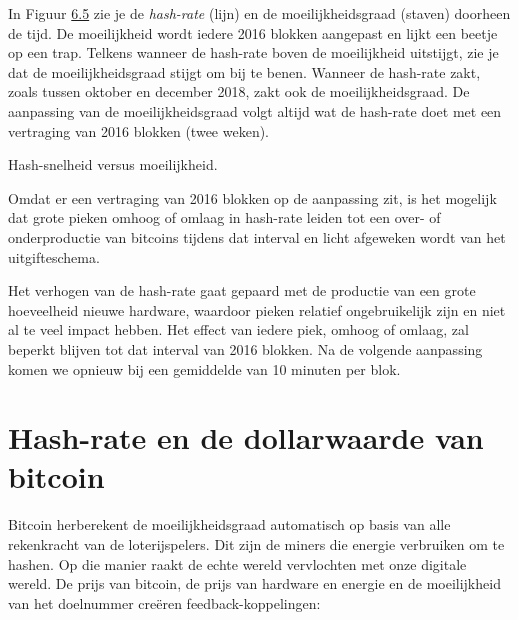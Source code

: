\documentclass[
  letterpaper,
]{scrbook}
\begin{document}
In Figuur \protect\hyperlink{fig10}{6.5} zie je de \emph{hash-rate}
(lijn) en de moeilijkheidsgraad (staven) doorheen de tijd. De
moeilijkheid wordt iedere 2016 blokken aangepast en lijkt een beetje op
een trap. Telkens wanneer de hash-rate boven de moeilijkheid uitstijgt,
zie je dat de moeilijkheidsgraad stijgt om bij te benen. Wanneer de
hash-rate zakt, zoals tussen oktober en december 2018, zakt ook de
moeilijkheidsgraad. De aanpassing van de moeilijkheidsgraad volgt altijd
wat de hash-rate doet met een vertraging van 2016 blokken (twee weken).

{Hash-snelheid versus moeilijkheid.}

Omdat er een vertraging van 2016 blokken op de aanpassing zit, is het
mogelijk dat grote pieken omhoog of omlaag in hash-rate leiden tot een
over- of onderproductie van bitcoins tijdens dat interval en licht
afgeweken wordt van het uitgifteschema.

Het verhogen van de hash-rate gaat gepaard met de productie van een
grote hoeveelheid nieuwe hardware, waardoor pieken relatief
ongebruikelijk zijn en niet al te veel impact hebben. Het effect van
iedere piek, omhoog of omlaag, zal beperkt blijven tot dat interval van
2016 blokken. Na de volgende aanpassing komen we opnieuw bij een
gemiddelde van 10 minuten per blok.

\hypertarget{hash-rate-en-de-dollarwaarde-van-bitcoin}{%
\section{Hash-rate en de dollarwaarde van
bitcoin}\label{hash-rate-en-de-dollarwaarde-van-bitcoin}}

Bitcoin herberekent de moeilijkheidsgraad automatisch op basis van alle
rekenkracht van de loterijspelers. Dit zijn de miners die energie
verbruiken om te hashen. Op die manier raakt de echte wereld vervlochten
met onze digitale wereld. De prijs van bitcoin, de prijs van hardware en
energie en de moeilijkheid van het doelnummer creëren
feedback-koppelingen:
\end{document}
